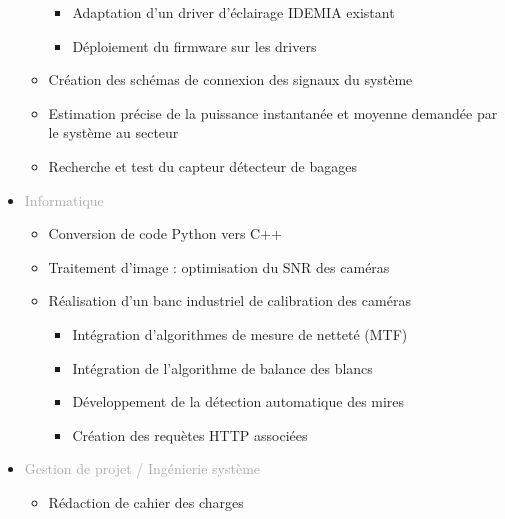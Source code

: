 \documentclass{article}
\begin{document}
\begin{tabular}
\begin{itemize}
\begin{itemize}
\begin{itemize}
                \item \textcolor{gray!80}{Adaptation d'un driver d'éclairage IDEMIA existant}
                \item \textcolor{gray!80}{Déploiement du firmware sur les drivers}
            \end{itemize}
            \item \textcolor{gray!80}{Création des schémas de connexion des signaux du système}
            \item \textcolor{gray!80}{Estimation précise de la puissance instantanée et moyenne demandée par le système au secteur}
            \item \textcolor{gray!80}{Recherche et test du capteur détecteur de bagages}
        \end{itemize}
        \item \textcolor{darkGray}{Informatique} 
        \begin{itemize}
        [label={\textcolor{gray!80}{\checkmark}}, topsep=10pt, partopsep=0pt, itemsep=0.5pt, parsep=2pt] 
            \item \textcolor{gray!80}{Conversion de code Python vers C++}
            \item \textcolor{gray!80}{Traitement d'image : optimisation du SNR des caméras}
            \item \textcolor{gray!80}{Réalisation d'un banc industriel de calibration des caméras}
            \begin{itemize}
            [label={\textcolor{gray!80}{\checkmark}}, topsep=10pt, partopsep=0pt, itemsep=0.5pt, parsep=2pt]   
                \item \textcolor{gray!80}{Intégration d'algorithmes de mesure de netteté (MTF) }
                \item \textcolor{gray!80}{Intégration de l'algorithme de balance des blancs}
                \item \textcolor{gray!80}{Développement de la détection automatique des mires}
                \item \textcolor{gray!80}{Création des requètes HTTP associées}
            \end{itemize}
        \end{itemize}
        \item \textcolor{darkGray}{Gestion de projet / Ingénierie système}
        \begin{itemize}
        [label={\textcolor{gray!80}{\checkmark}}, topsep=10pt, partopsep=0pt, itemsep=0.5pt, parsep=2pt] 
            \item \textcolor{gray!80}{Rédaction de cahier des charges}

\end{itemize}
\end{itemize}
\end{tabular}
\end{document}

